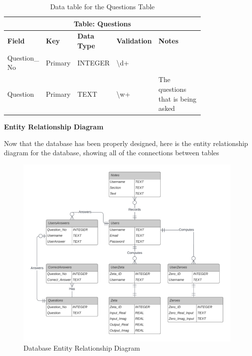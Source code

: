 \documentclass{article}
\begin{document}
\begin{table}[ht]
    \centering
    \begin{tabular}{ | p{0.15\linewidth} | p{0.1\linewidth} | p{0.16\linewidth} | p{0.14\linewidth} | p{0.25\linewidth} | }
    \hline
    \multicolumn{5}{|c|}{\textbf{Table: Questions}}\\
    \hline
    \hline
    \textbf{Field} & \textbf{Key} & \textbf{Data Type} & \textbf{Validation} & \textbf{Notes} \\
    \hline
    Question\_ No & Primary & INTEGER & \textbackslash d+ &\\
    \hline
    Question & Primary & TEXT & \textbackslash w+ & The questions that is being asked\\
    \hline
    \end{tabular}
    \caption{Data table for the Questions Table}
\end{table}

\clearpage
\textbf{Entity Relationship Diagram}

Now that the database has been properly designed, here is the entity relationship diagram for the database, showing all of the connections between tables

\begin{figure}[h]
    \centering
    \captionsetup{justification=centering}
    \includegraphics[scale=0.17]{database-er-diagram}
    \caption{Database Entity Relationship Diagram}
\end{figure}
\end{document}
